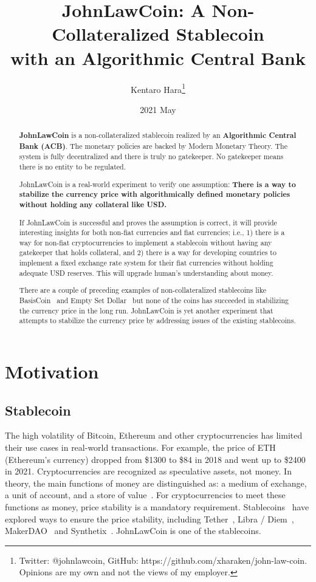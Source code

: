 \documentclass[dvipdfmx,a4paper]{article}
\title{\textbf{JohnLawCoin: A Non-Collateralized Stablecoin\\ with an Algorithmic Central Bank}}
\author{Kentaro Hara\footnote{Twitter: @johnlawcoin, GitHub: https://github.com/xharaken/john-law-coin. Opinions are my own and not the views of my employer.}}
\date{2021 May}
\begin{document}
\maketitle

\begin{abstract}

\textbf{JohnLawCoin} is a non-collateralized stablecoin realized by an \textbf{Algorithmic Central Bank (ACB)}. The monetary policies are backed by Modern Monetary Theory. The system is fully decentralized and there is truly no gatekeeper. No gatekeeper means there is no entity to be regulated.

JohnLawCoin is a real-world experiment to verify one assumption: \textbf{There is a way to stabilize the currency price with algorithmically defined monetary policies without holding any collateral like USD.}

If JohnLawCoin is successful and proves the assumption is correct, it will provide interesting insights for both non-fiat currencies and fiat currencies; i.e., 1) there is a way for non-fiat cryptocurrencies to implement a stablecoin without having any gatekeeper that holds collateral, and 2) there is a way for developing countries to implement a fixed exchange rate system for their fiat currencies without holding adequate USD reserves. This will upgrade human's understanding about money.

There are a couple of preceding examples of non-collateralized stablecoins like BasisCoin~\cite{basiscoin} and Empty Set Dollar~\cite{emptysetdollar} but none of the coins has succeeded in stabilizing the currency price in the long run. JohnLawCoin is yet another experiment that attempts to stabilize the currency price by addressing issues of the existing stablecoins.

\end{abstract}

\section{Motivation}

\subsection{Stablecoin}

The high volatility of Bitcoin, Ethereum and other cryptocurrencies has limited their use cases in real-world transactions. For example, the price of ETH (Ethereum's currency) dropped from \$1300 to \$84 in 2018 and went up to \$2400 in 2021. Cryptocurrencies are recognized as speculative assets, not money. In theory, the main functions of money are distinguished as: a medium of exchange, a unit of account, and a store of value~\cite{davies2010history,ferguson2008ascent}. For cryptocurrencies to meet these functions as money, price stability is a mandatory requirement. Stablecoins~\cite{mita2019stablecoin,klages2020stablecoins} have explored ways to ensure the price stability, including Tether~\cite{tether}, Libra / Diem~\cite{libra}, MakerDAO~\cite{makerdao} and Synthetix~\cite{synthetix}. JohnLawCoin is one of the stablecoins.
\end{document}
